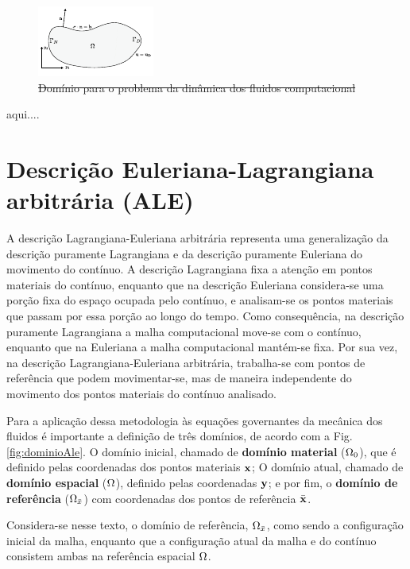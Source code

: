\documentclass[tese_patricia]{subfiles}%
\begin{document}
\begin{figure}[htb!]
	\centering 
	\includegraphics[scale=3.0,trim=0cm 0.0cm 0cm 0.0cm, clip=true]{Imagens/Cap2/dominioFluido.pdf}	
	\caption{\sout{Domínio para o problema da dinâmica dos fluidos computacional}}
	\label{fig:dominioFluido}
\end{figure}

aqui....
\section{Descrição Euleriana-Lagrangiana arbitrária (ALE)} \label{capitulo:Cap2:ALE}

A descrição Lagrangiana-Euleriana arbitrária \cite{DoneaGH:1982} representa uma generalização da descrição puramente Lagrangiana e da descrição puramente Euleriana do movimento do contínuo. A descrição Lagrangiana fixa a atenção em pontos materiais do contínuo, enquanto que na descrição Euleriana considera-se uma porção fixa do espaço ocupada pelo contínuo, e analisam-se os pontos materiais que passam por essa porção ao longo do tempo. Como consequência, na descrição puramente Lagrangiana a malha computacional move-se com o contínuo, enquanto que na Euleriana a malha computacional mantém-se fixa. Por sua vez, na descrição Lagrangiana-Euleriana arbitrária, trabalha-se com pontos de referência que podem movimentar-se, mas de maneira independente do movimento dos pontos materiais do contínuo analisado.

Para a aplicação dessa metodologia às equações governantes da mecânica dos fluidos é importante a definição de três domínios, de acordo com a Fig. \ref{fig:dominioAle}. O domínio inicial, chamado de \textbf{domínio material} ($\Omega_{0}$), que é definido pelas coordenadas dos pontos materiais $\mathbf{x}$; O domínio atual, chamado de \textbf{domínio espacial} ($\Omega$), definido pelas coordenadas $\mathbf{y}$; e por fim, o \textbf{domínio de referência} ($\Omega_{\bar{x}}$) com coordenadas dos pontos de referência $\bar{\mathbf{x}}$. 

Considera-se nesse texto, o domínio de referência, $\Omega_{\bar{x}}$, como sendo a configuração inicial da malha, enquanto que a configuração atual da malha e do contínuo consistem ambas na referência espacial $\Omega$.
\end{document}
